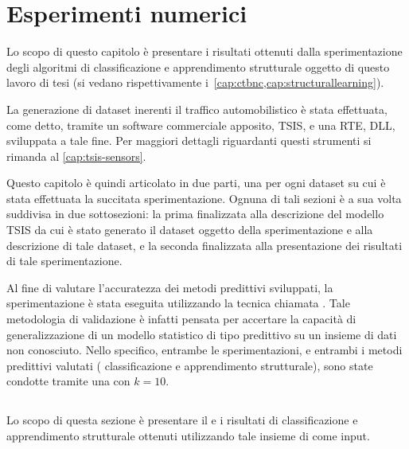 
\chapter{Esperimenti numerici}\label{cap:esperimenti}
Lo scopo di questo capitolo è presentare i risultati ottenuti dalla sperimentazione degli algoritmi di classificazione e apprendimento strutturale oggetto di questo lavoro di tesi (si vedano rispettivamente i~\vref{cap:ctbnc,cap:structurallearning}).

La generazione di dataset inerenti il traffico automobilistico è stata effettuata, come detto, tramite un software commerciale apposito, \acs{TSIS}, e una \acl{RTE},  \acs{DLL}, sviluppata a tale fine. Per maggiori dettagli riguardanti questi strumenti si rimanda al \vref{cap:tsis-sensors}.

Questo capitolo è quindi articolato in due parti, una per ogni dataset su cui è stata effettuata la succitata sperimentazione. Ognuna di tali sezioni è a sua volta suddivisa in due sottosezioni: la prima finalizzata alla descrizione del modello \acs{TSIS} da cui è stato generato il dataset oggetto della sperimentazione e alla descrizione di tale dataset, e la seconda finalizzata alla presentazione dei risultati di tale sperimentazione.

Al fine di valutare l'accuratezza dei metodi predittivi sviluppati, la sperimentazione è stata eseguita utilizzando la tecnica chiamata \emph{}. Tale metodologia di validazione è infatti pensata per accertare la capacità di generalizzazione di un modello statistico di tipo predittivo su un insieme di dati non conosciuto. Nello specifico, entrambe le sperimentazioni, e entrambi i metodi predittivi valutati (\ie{} classificazione e apprendimento strutturale), sono state condotte tramite una \emph{} \emph{} con $k=10$.

\section{}\label{sec:dataset-1}
Lo scopo di questa sezione è presentare il  e i risultati di classificazione e apprendimento strutturale ottenuti utilizzando tale insieme di \emph{} come input.


